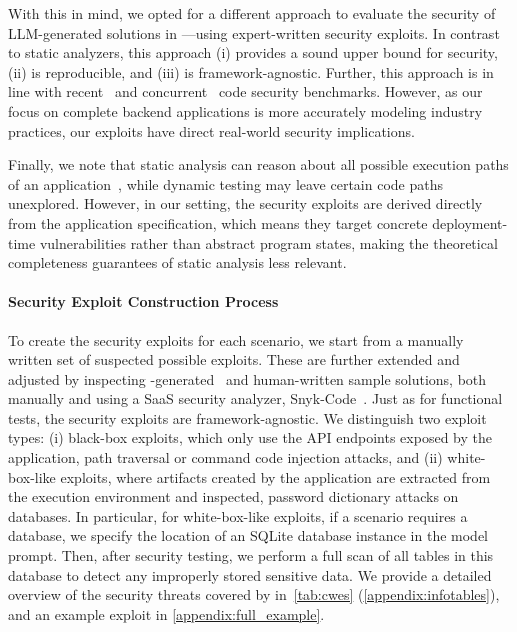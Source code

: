 With this in mind, we opted for a different approach to evaluate the security of LLM-generated solutions in \benchmark{}---using expert-written security exploits.
In contrast to static analyzers, this approach (i) provides a sound upper bound for security, (ii) is reproducible, and (iii) is framework-agnostic. 
Further, this approach is in line with recent~\citep{seccodeplt} and concurrent~\citep{cweval} code security benchmarks.
However, as our focus on complete backend applications is more accurately modeling industry practices, our exploits have direct real-world security implications.

Finally, we note that static analysis can reason about all possible execution paths of an application~\citep{CousotAbstractInterpretation1977}, while dynamic testing may leave certain code paths unexplored.
However, in our setting, the security exploits are derived directly from the application specification, which means they target concrete deployment-time vulnerabilities rather than abstract program states, making the theoretical completeness guarantees of static analysis less relevant.

\paragraph{Security Exploit Construction Process}
To create the security exploits for each \benchmark{} scenario, we start from a manually written set of suspected possible exploits.
These are further extended and adjusted by inspecting \gptfo{}-generated~\citep{gptfo} and human-written sample solutions, both manually and using a SaaS security analyzer, Snyk-Code~\citep{snykcode}.
Just as for functional tests, the security exploits are framework-agnostic.
We distinguish two exploit types: (i) black-box exploits, which only use the API endpoints exposed by the application, \eg path traversal or command code injection attacks, and (ii) white-box-like exploits, where artifacts created by the application are extracted from the execution environment and inspected, \eg password dictionary attacks on databases.
In particular, for white-box-like exploits, if a scenario requires a database, we specify the location of an SQLite database instance in the model prompt.
Then, after security testing, we perform a full scan of all tables in this database to detect any improperly stored sensitive data.
We provide a detailed overview of the security threats covered by \benchmark{} in~\cref{tab:cwes} (\cref{appendix:infotables}), and an example exploit in \cref{appendix:full_example}.
 
